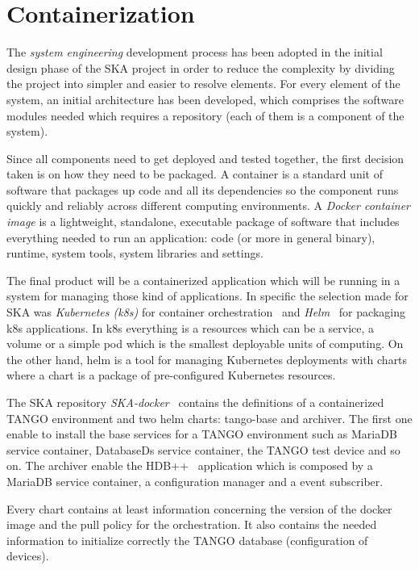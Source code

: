 \documentclass[a4paper]{spie}  %
\begin{document}
\section{Containerization} \label{SKA-docker}
The \textit{system engineering} development process has been adopted in the initial design phase of the SKA project in order to reduce the complexity by dividing the project into simpler and easier to resolve elements. For every element of the system, an initial architecture has been developed, which comprises the software modules needed which requires a repository (each of them is a component of the system).

Since all components need to get deployed and tested together, the first decision taken is on how they need to be packaged.  A container is a standard unit of software that packages up code and all its dependencies so the component runs quickly and reliably across different computing environments. A \textit{Docker container image} is a lightweight, standalone, executable package of software that includes everything needed to run an application: code (or more in general binary), runtime, system tools, system libraries and settings.

The final product will be a containerized application which will be running in a system for managing those kind of applications. In specific the selection made for SKA was \textit{Kubernetes (k8s)} for container orchestration~\cite{kubernetes} and \textit{Helm}~\cite{helm} for packaging k8s applications. In k8s everything is a resources which can be a service, a volume or a simple pod which is the smallest deployable units of computing. On the other hand, helm is a tool for managing Kubernetes deployments with charts where a chart is a package of pre-configured Kubernetes resources. 

The SKA repository \textit{SKA-docker}~\cite{SKA-docker} contains the definitions of a containerized TANGO environment and two helm charts: tango-base and archiver. The first one enable to install the base services for a TANGO environment such as MariaDB service container, DatabaseDs service container, the TANGO test device and so on. The archiver enable the HDB++~\cite{HDB++} application which is composed by a MariaDB service container, a configuration manager and a event subscriber. 

Every chart contains at least information concerning the version of the docker image and the pull policy for the orchestration. It also contains the needed information to initialize correctly the TANGO database (configuration of devices). 
\end{document}
